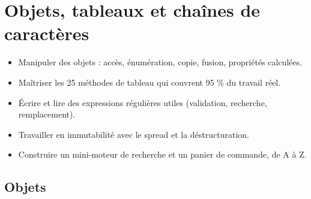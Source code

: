 \chapter{Objets, tableaux et cha\^ines de caract\`eres}
\label{ch-js-struct}

\begin{objectif}
\begin{itemize}
  \item Manipuler des objets : acc\`es, \'enum\'eration, copie, fusion, propri\'et\'es calcul\'ees.
  \item Ma\^itriser les 25 m\'ethodes de tableau qui couvrent 95 \% du travail r\'eel.
  \item \'Ecrire et lire des expressions r\'eguli\`eres utiles (validation, recherche, remplacement).
  \item Travailler en immutabilit\'e avec le spread et la d\'estructuration.
  \item Construire un mini-moteur de recherche et un panier de commande, de A \`a Z.
\end{itemize}
\end{objectif}

\section{Objets}

